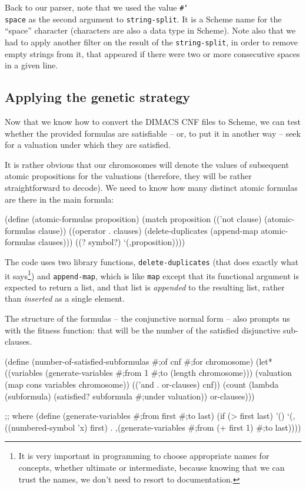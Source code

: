 Back to our parser, note that we used the value
\texttt{\#\char`\\space} as the second argument to 
\texttt{string-split}. It is a Scheme name for the ``space'' character 
(characters are also a data type in Scheme). Note also
that we had to apply another filter on the result of the
\texttt{string-split}, in order to remove empty strings from it,
that appeared if there were two or more
consecutive spaces in a given line.

\subsection{Applying the genetic strategy}

Now that we know how to convert the DIMACS CNF files to Scheme,
we can test whether the provided formulas are satisfiable -- or,
to put it in another way -- seek for a valuation under which
they are satisfied.

It is rather obvious that our chromosomes will denote the
values of subsequent atomic propositions for the valuations
(therefore, they will be rather straightforward to decode).
We need to know how many distinct atomic formulas are there
in the main formula:

\begin{Snippet}
(define (atomic-formulas proposition)
  (match proposition
    (('not clause)
     (atomic-formulas clause))
    ((operator . clauses)
     (delete-duplicates (append-map atomic-formulas clauses)))
    ((? symbol?)
     `(,proposition))))
\end{Snippet}

The code uses two library functions, \texttt{delete-duplicates}
(that does exactly what it says\footnote{
It is very important in programming to choose appropriate
names for concepts, whether ultimate or intermediate, because
knowing that we can trust the names, we don't need to resort
to documentation.
}) and \texttt{append-map}, which
is like \texttt{map} except that its functional argument is
expected to return a list, and that list is \textit{appended}
to the resulting list, rather than \textit{inserted} as
a single element.

The structure of the formulas -- the conjunctive normal
form -- also prompts us with the fitness function: that
will be the number of the satisfied disjunctive sub-clauses.

\begin{Snippet}
(define (number-of-satisfied-subformulas #;of cnf #;for chromosome)
  (let* ((variables (generate-variables #;from 1
                                        #;to (length chromosome)))
         (valuation (map cons variables chromosome))
         (('and . or-clauses) cnf))
    (count (lambda (subformula)
             (satisfied? subformula #;under valuation))
           or-clauses)))
\end{Snippet}
\begin{Snippet}
;; where
(define (generate-variables #;from first #;to last)
  (if (> first last)
    '()
    `(,((numbered-symbol 'x) first) 
      . ,(generate-variables #;from (+ first 1) #;to last))))
\end{Snippet}

